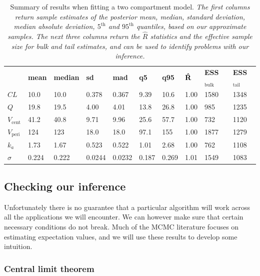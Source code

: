 \begin{table}[!h]
  \renewcommand{\arraystretch}{1.5}
  \begin{tabular}{l l l l l l l l l l}
  \rowcolor[gray]{0.95} & \bf mean & \bf median & \bf sd & \bf mad & \bf q5 & \bf q95 & $\bf \hat R$ & \bf ESS$_\mathrm{bulk}$ & \bf ESS$_\mathrm{tail}$ \\
$CL$    &    10.0  &  10.0  &  0.378  & 0.367 &  9.39 &  10.6  &  1.00   & 1580  &  1348 \\
\rowcolor[gray]{0.95} $Q$      &  19.8    & 19.5  &  4.00  &  4.01 &  13.8  &   26.8 &   1.00  &   985 &    1235 \\
$V_\mathrm{cent}$   &   41.2  &  40.8 &   9.71   & 9.96  & 25.6 &   57.7   & 1.00   &  732  &  1120 \\
\rowcolor[gray]{0.95} $V_\mathrm{peri}$    &  124 &   123 &    18.0  &  18.0 &    97.1 &  155 &   1.00  &  1877 &    1279 \\
$k_a$       &  1.73   & 1.67 &  0.523  & 0.522   & 1.01 &   2.68 &   1.00   &  762 &    1108 \\
\rowcolor[gray]{0.95} $\sigma$   & 0.224 &   0.222 &  0.0244 &  0.0232 &  0.187 &   0.269 &  1.01  & 1549 &   1083
  \end{tabular}
  \caption{Summary of results when fitting a two compartment model. \textit{The first columns return sample estimates of the posterior mean, median, standard deviation, median absolute deviation, $5^\mathrm{th}$ and $95^\mathrm{th}$ quantiles, based on our approximate samples.
  The next three columns return the $\hat R$ statistics and the effective sample size for bulk and tail estimates, and can be used to identify problems with our inference.}}
  \label{tab:summary}
\end{table}

\subsection{Checking our inference}

Unfortunately there is no guarantee that a particular algorithm will work across all the applications we will encounter.
We can however make sure that certain necessary conditions do not break.
Much of the MCMC literature focuses on estimating expectation values, and we will use these results to develop some intuition.

\subsubsection{Central limit theorem}

